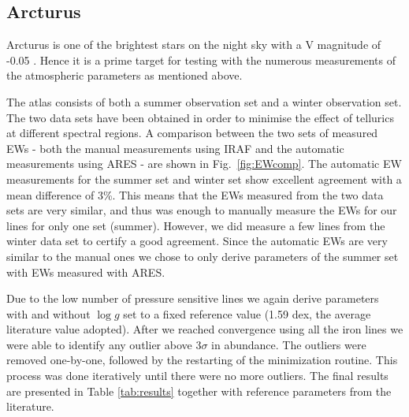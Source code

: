 \documentclass[a4paper,fleqn,usenatbib]{mnras}
\begin{document}
\subsection{Arcturus}
\label{sec:arcturus}

Arcturus is one of the brightest stars on the night sky with a V magnitude of
-0.05 \citep{Ducati2002}. Hence it is a prime target for testing with the
numerous measurements of the atmospheric parameters as mentioned above.

The atlas consists of both a summer observation set and a winter observation
set. The two data sets have been obtained in order to minimise the effect of
tellurics at different spectral regions. A comparison between the two sets of
measured EWs - both the manual measurements using IRAF and the automatic
measurements using ARES - are shown in Fig.~\ref{fig:EWcomp}. The automatic EW
measurements for the summer set and winter set show excellent agreement
with a mean difference of 3\%. This means that the EWs measured from the two data sets 
are very similar, and thus was enough to manually measure the EWs for our lines for only one set (summer).
However, we did measure a few lines from the winter data set to certify a good agreement. Since the automatic EWs are very 
similar to the manual ones we chose to only derive parameters of the summer set with EWs measured with ARES.

Due to the low number of pressure sensitive  lines we again derive parameters with and
without $\log g$ set to a fixed reference value (1.59 dex, the average literature value adopted). 
After we reached convergence using all the iron lines we were able 
to identify any outlier above $3\sigma$ in abundance. The outliers were removed one-by-one, followed by the restarting of 
the minimization routine. This process was done iteratively until there were no more outliers. The final results are 
presented in Table \ref{tab:results} together with reference parameters from the literature.
\end{document}
